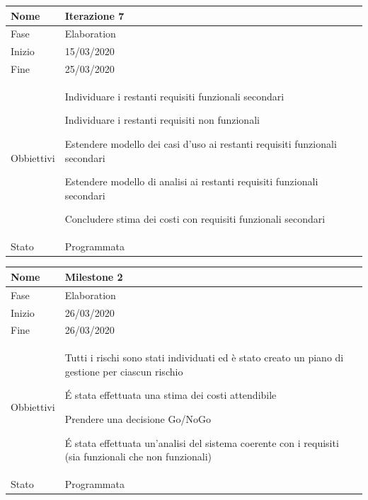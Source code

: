 \begin{center}
\begin{tabular}{ |p{2cm}|p{10cm}|  }
\hline
Nome & Iterazione 7 \\\hline
Fase & Elaboration \\\hline
Inizio & 15/03/2020 \\\hline
Fine & 25/03/2020 \\\hline
Obbiettivi & 
	\begin{compactitem}
		\item Individuare i restanti requisiti funzionali secondari %
		\item Individuare i restanti requisiti non funzionali %
		\item Estendere modello dei casi d'uso ai restanti requisiti funzionali secondari
		\item Estendere modello di analisi ai restanti requisiti funzionali secondari
		\item Concludere stima dei costi con requisiti funzionali secondari
		

	\end{compactitem}\\\hline
Stato &  Programmata \\\hline
\end{tabular}
\label{table:7}\newline

\begin{tabular}{ |p{2cm}|p{10cm}|  }
\hline
Nome & Milestone 2\\\hline
Fase & Elaboration \\\hline
Inizio & 26/03/2020 \\\hline
Fine &  26/03/2020 \\\hline
Obbiettivi & 
	\begin{compactitem}
		\item Tutti i rischi sono stati individuati ed è stato creato un piano di gestione per ciascun rischio
		\item \'E stata effettuata una stima dei costi attendibile
		\item Prendere una decisione Go/NoGo
		\item \'E stata effettuata un'analisi del sistema coerente con i requisiti (sia funzionali che non funzionali)
		


	\end{compactitem}\\\hline
Stato &  Programmata \\\hline
\end{tabular}
\label{table:milestone3}\newline


\end{center}
